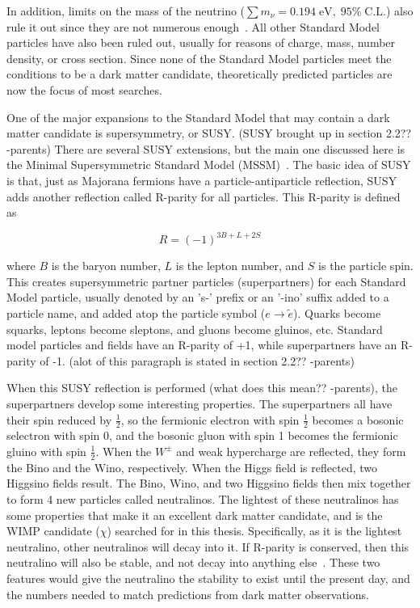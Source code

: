 In addition, limits on the mass of the neutrino ($\sum{}m_{\nu} = 0.194 \; \textrm{eV}, \; 95\% \; \textrm{C.L.}$) also rule it out since they are not numerous enough~\cite{planck2015}.
All other Standard Model particles have also been ruled out, usually for reasons of charge, mass, number density, or cross section.
Since none of the Standard Model particles meet the conditions to be a dark matter candidate, theoretically predicted particles are now the focus of most searches.

One of the major expansions to the Standard Model that may contain a dark matter candidate is supersymmetry, or SUSY.
{\color{red}(SUSY brought up in section 2.2?? -parents)}
There are several SUSY extensions, but the main one discussed here is the Minimal Supersymmetric Standard Model (MSSM)~\cite{MSSM,supersym1,schelke_thesis}.
The basic idea of SUSY is that, just as Majorana fermions have a particle-antiparticle reflection, SUSY adds another reflection called R-parity for all particles. 
This R-parity is defined as

\begin{equation}
  R = (-1)^{3B+L+2S}
\end{equation}

where $B$ is the baryon number, $L$ is the lepton number, and $S$ is the particle spin.
This creates supersymmetric partner particles (superpartners) for each Standard Model particle, usually denoted by an 's-' prefix or an '-ino' suffix added to a particle name, and \nicetilde{} added atop the particle symbol ($e \rightarrow \tilde{e}$).
Quarks become squarks, leptons become sleptons, and gluons become gluinos, etc.
Standard model particles and fields have an R-parity of +1, while superpartners have an R-parity of -1.
{\color{red}(alot of this paragraph is stated in section 2.2?? -parents)}

When this {\color{red}SUSY reflection is performed (what does this mean?? -parents)}, the superpartners develop some interesting properties.
The superpartners all have their spin reduced by $\frac{1}{2}$, so the fermionic electron with spin $\frac{1}{2}$ becomes a bosonic selectron with spin $0$, and the bosonic gluon with spin 1 becomes the fermionic gluino with spin $\frac{1}{2}$.
When the $W^{\pm}$  and weak hypercharge are reflected, they form the Bino and the Wino, respectively.
When the Higgs field is reflected, two Higgsino fields result.
The Bino, Wino, and two Higgsino fields then mix together to form 4 new particles called neutralinos.
The lightest of these neutralinos has some properties that make it an excellent dark matter candidate, and is the WIMP candidate ($\chi$) searched for in this thesis.
Specifically, as it is the lightest neutralino, other neutralinos will decay into it.
If R-parity is conserved, then this neutralino will also be stable, and not decay into anything else~\cite{neutralino1,neutralino2,neutralino3}.
These two features would give the neutralino the stability to exist until the present day, and the numbers needed to match predictions from dark matter observations.

